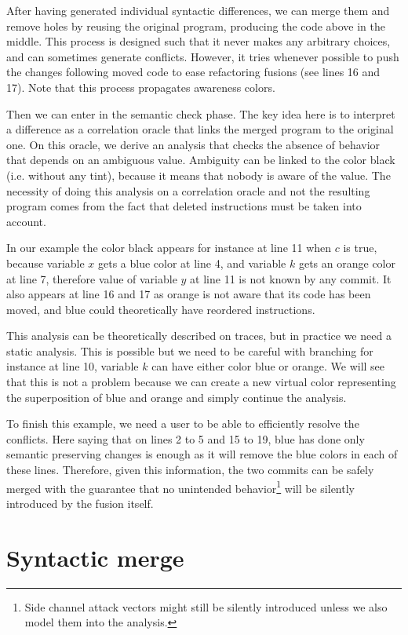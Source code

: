\documentclass[a4paper,11pt]{article}
\begin{document}
After having generated individual syntactic differences, we can merge them  and remove holes by reusing the original program, producing the code above in the middle. This process is designed such that it never makes any arbitrary choices, and can sometimes generate conflicts. However, it tries whenever possible to push the changes following moved code to ease refactoring fusions (see lines 16 and 17). Note that this process propagates awareness colors.

Then we can enter in the semantic check phase. The key idea here is to interpret a difference as a correlation oracle that links the merged program to the original one. On this oracle, we derive an analysis that checks the absence of behavior that depends on an ambiguous value. Ambiguity can be linked to the color black (i.e. without any tint), because it means that nobody is aware of the value. The necessity of doing this analysis on a correlation oracle and not the resulting program comes from the fact that deleted instructions must be taken into account.

In our example the color black appears for instance at line 11 when $c$ is true, because variable $x$ gets a blue color at line 4, and variable $k$ gets an orange color at line 7, therefore value of variable $y$ at line 11 is not known by any commit. It also appears at line 16 and 17 as orange is not aware that its code has been moved, and blue could theoretically have reordered instructions.

This analysis can be theoretically described on traces, but in practice we need a static analysis. This is possible but we need to be careful with branching for instance at line 10, variable $k$ can have either color blue or orange. We will see that this is not a problem because we can create a new virtual color representing the superposition of blue and orange and simply continue the analysis.

To finish this example, we need a user to be able to efficiently resolve the conflicts. Here saying that on lines 2 to 5 and 15 to 19, blue has done only semantic preserving changes is enough as it will remove the blue colors in each of these lines. Therefore, given this information, the two commits can be safely merged with the guarantee that no unintended behavior\footnote{Side channel attack vectors might still be silently introduced unless we also model them into the analysis.} will be silently introduced by the fusion itself.

\section{Syntactic merge}
\label{sec:syntactic-merge}
\end{document}
